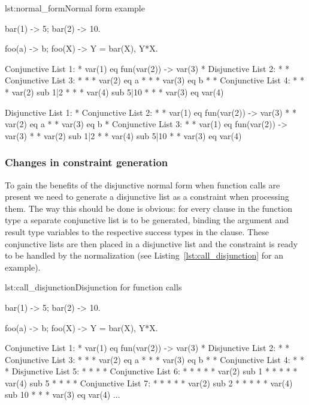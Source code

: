 \begin{console}{lst:normal_form}{Normal form example}

bar(1) -> 5;
bar(2) -> 10.

foo(a) -> b;
foo(X) ->
  Y = bar(X),
  Y*X.


Conjunctive List 1:
 * var(1) eq fun(var(2)) -> var(3)
 * Disjunctive List 2:
 *  * Conjunctive List 3:
 *  *  * var(2) eq a
 *  *  * var(3) eq b
 *  * Conjunctive List 4:
 *  *  * var(2) sub 1|2
 *  *  * var(4) sub 5|10
 *  *  * var(3) eq var(4)


Disjunctive List 1:
 * Conjunctive List 2:
 *  *  var(1) eq fun(var(2)) -> var(3)
 *  *  var(2) eq a
 *  *  var(3) eq b
 *  Conjunctive List 3:
 *  *  var(1) eq fun(var(2)) -> var(3)
 *  *  var(2) sub 1|2
 *  *  var(4) sub 5|10
 *  *  var(3) eq var(4)
\end{console}

\subsubsection{Changes in constraint generation}
\label{sct:intersect_constr_generation}

To gain the benefits of the disjunctive normal form when function
calls are present we need to generate a disjunctive list as a
constraint when processing them. The way this should be done is
obvious: for every clause in the function type a separate conjunctive
list is to be generated, binding the argument and result type
variables to the respective success types in the clause. These
conjunctive lists are then placed in a disjunctive list and the
constraint is ready to be handled by the normalization (see
Listing~\ref{lst:call_disjunction} for an example).

\begin{console}{lst:call_disjunction}{Disjunction for function calls}

bar(1) -> 5;
bar(2) -> 10.

foo(a) -> b;
foo(X) ->
  Y = bar(X),
  Y*X.


Conjunctive List 1:
 * var(1) eq fun(var(2)) -> var(3)
 * Disjunctive List 2:
 *  * Conjunctive List 3:
 *  *  * var(2) eq a
 *  *  * var(3) eq b
 *  * Conjunctive List 4:
 *  *  * Disjunctive List 5:
 *  *  *  *  Conjunctive List 6:
 *  *  *  *  *  var(2) sub 1
 *  *  *  *  *  var(4) sub 5
 *  *  *  *  Conjunctive List 7:
 *  *  *  *  *  var(2) sub 2
 *  *  *  *  *  var(4) sub 10
 *  *  * var(3) eq var(4)
 ...
\end{console}

